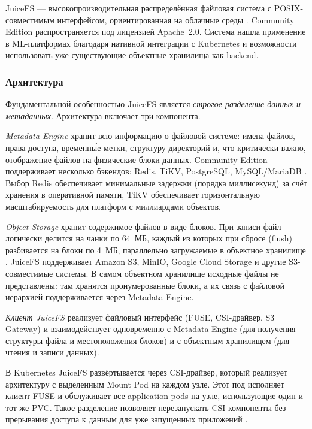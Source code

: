 JuiceFS --- высокопроизводительная распределённая файловая система с POSIX-совместимым интерфейсом, ориентированная на облачные среды \cite{juicefs_intro}. Community Edition распространяется под лицензией Apache~2.0. Система нашла применение в ML-платформах благодаря нативной интеграции с Kubernetes и возможности использовать уже существующие объектные хранилища как backend.

\subsubsection*{Архитектура}

Фундаментальной особенностью JuiceFS является \textit{строгое разделение данных и метаданных}. Архитектура включает три компонента.

\textit{Metadata Engine} хранит всю информацию о файловой системе: имена файлов, права доступа, временны́е метки, структуру директорий и, что критически важно, отображение файлов на физические блоки данных. Community Edition поддерживает несколько бэкендов: Redis, TiKV, PostgreSQL, MySQL/MariaDB \cite{juicefs_design}. Выбор Redis обеспечивает минимальные задержки (порядка миллисекунд) за счёт хранения в оперативной памяти, TiKV обеспечивает горизонтальную масштабируемость для платформ с миллиардами объектов.

\textit{Object Storage} хранит содержимое файлов в виде блоков. При записи файл логически делится на чанки по 64~МБ, каждый из которых при сбросе (flush) разбивается на блоки по 4~МБ, параллельно загружаемые в объектное хранилище \cite{juicefs_design}. JuiceFS поддерживает Amazon S3, MinIO, Google Cloud Storage и другие S3-совместимые системы. В самом объектном хранилище исходные файлы не представлены: там хранятся пронумерованные блоки, а их связь с файловой иерархией поддерживается через Metadata Engine.

\textit{Клиент JuiceFS} реализует файловый интерфейс (FUSE, CSI-драйвер, S3 Gateway) и взаимодействует одновременно с Metadata Engine (для получения структуры файла и местоположения блоков) и с объектным хранилищем (для чтения и записи данных).

В Kubernetes JuiceFS развёртывается через CSI-драйвер, который реализует архитектуру с выделенным Mount Pod на каждом узле. Этот под исполняет клиент FUSE и обслуживает все application pods на узле, использующие один и тот же PVC. Такое разделение позволяет перезапускать CSI-компоненты без прерывания доступа к данным для уже запущенных приложений \cite{juicefs_perf}.


